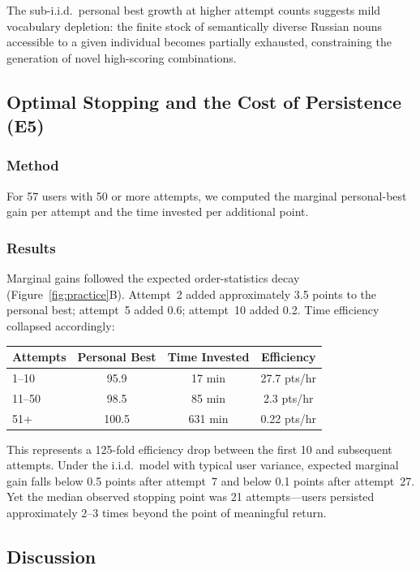 \documentclass[12pt]{article}
\begin{document}
The sub-i.i.d.\ personal best growth at higher attempt counts suggests mild vocabulary depletion: the finite stock of semantically diverse Russian nouns accessible to a given individual becomes partially exhausted, constraining the generation of novel high-scoring combinations.

\subsection{Optimal Stopping and the Cost of Persistence (E5)}

\subsubsection{Method}

For 57 users with 50 or more attempts, we computed the marginal personal-best gain per attempt and the time invested per additional point.

\subsubsection{Results}

Marginal gains followed the expected order-statistics decay (Figure~\ref{fig:practice}B). Attempt~2 added approximately 3.5 points to the personal best; attempt~5 added 0.6; attempt~10 added 0.2. Time efficiency collapsed accordingly:

\begin{table}[htbp]
\centering
\small
\begin{tabular}{@{}lccc@{}}
\toprule
Attempts & Personal Best & Time Invested & Efficiency \\
\midrule
1--10  & 95.9  & 17 min  & 27.7 pts/hr \\
11--50 & 98.5  & 85 min  & 2.3 pts/hr \\
51+    & 100.5 & 631 min & 0.22 pts/hr \\
\bottomrule
\end{tabular}
\end{table}

This represents a 125-fold efficiency drop between the first 10 and subsequent attempts. Under the i.i.d.\ model with typical user variance, expected marginal gain falls below 0.5 points after attempt~7 and below 0.1 points after attempt~27. Yet the median observed stopping point was 21 attempts---users persisted approximately 2--3 times beyond the point of meaningful return.

\subsection{Discussion}
\end{document}
